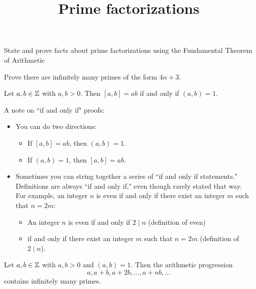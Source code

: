 \documentclass{ximera}
\title{Prime factorizations}
\begin{document}
\begin{abstract}
\end{abstract}
\maketitle

\begin{obj}
    \item State and prove facts about prime factorizations using the Fundamental Theorem of Arithmetic
    \item Prove there are infinitely many primes of the form $4n+3$.
\end{obj}


\begin{corollary}\label{cor:lcm-gcd}
 Let $a,b\in\mathbb Z$ with $a,b>0$. Then $[a,b]=ab$ if and only if $(a,b)=1$.
\end{corollary}
A note on ``if and only if" proofs: 
\begin{itemize}
 \item You can do two directions: 
\begin{itemize}
 \item  If $[a,b]=ab$, then $(a,b)=1$.
 \item  If $(a,b)=1$, then $[a,b]=ab$.
\end{itemize}
\item Sometimes you can string together a series of ``if and only if statements." Definitions are always ``if and only if," even though rarely stated that way. For example, an integer $n$ is even if and only if there exist an integer $m$ such that $n=2m$:
\begin{itemize}
 \item An integer $n$ is even if and only if $2\mid n$ (definition of even) 
 \item if and only if there exist an integer $m$ such that $n=2m$ (definition of $2\mid n$).
\end{itemize}
\end{itemize}

\begin{thm*}\label{thm:dirichlet}
    Let $a,b\in\mathbb Z$ with $a,b>0$ and $(a,b)=1$. Then the arithmetic progression \[a,a+b, a+2b, \dots, a+nb,\dots\]
    contains infinitely many primes.
\end{thm*}
\end{document}

